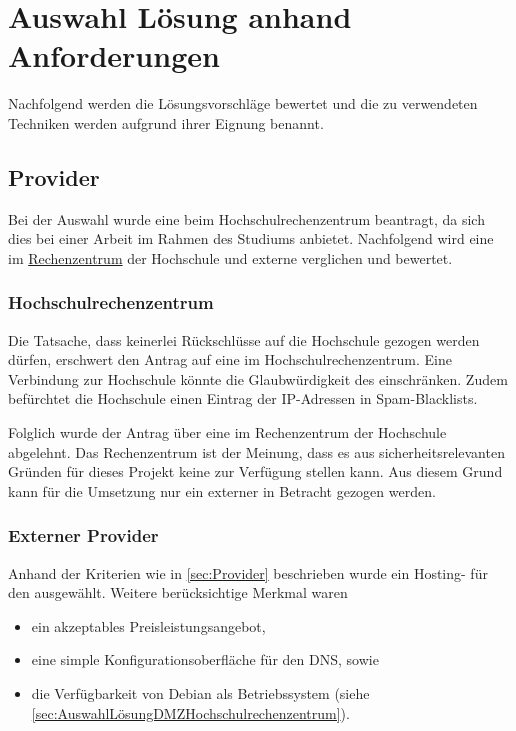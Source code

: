 \documentclass[a4paper,11pt,singlespacing]{article}
\begin{document}
\newpage


\section{Auswahl Lösung anhand Anforderungen}\label{sec:AuswahlLösungAnhandAnforderungen}
	Nachfolgend werden die Lösungsvorschläge bewertet und die zu verwendeten Techniken werden aufgrund ihrer Eignung benannt.

	\subsection{Provider}\label{sec:AuswahlLösungProvider}
		Bei der  Auswahl wurde eine  beim Hochschulrechenzentrum beantragt, da sich dies bei einer Arbeit im Rahmen des Studiums anbietet.
		Nachfolgend wird eine  im \href{https://www.hs-weingarten.de/web/rechenzentrum}{Rechenzentrum} der Hochschule und externe  verglichen und bewertet.
		
		\subsubsection{Hochschulrechenzentrum}\label{sec:AuswahlLösungDMZHochschulrechenzentrum}
			Die Tatsache, dass keinerlei Rückschlüsse auf die Hochschule gezogen werden dürfen, erschwert den Antrag auf eine  im Hochschulrechenzentrum.
			Eine Verbindung zur Hochschule könnte die Glaubwürdigkeit des  einschränken.
			Zudem befürchtet die Hochschule einen Eintrag der IP-Adressen in Spam-Blacklists.

			Folglich wurde der Antrag über eine  im Rechenzentrum der Hochschule abgelehnt.
			Das Rechenzentrum ist der Meinung, dass es aus sicherheitsrelevanten Gründen für dieses Projekt keine  zur Verfügung stellen kann.
			Aus diesem Grund kann für die Umsetzung nur ein externer  in Betracht gezogen werden.

		\subsubsection{Externer Provider}\label{sec:AuswahlLösungExterneProvider}
			Anhand der Kriterien wie in \autoref{sec:Provider} beschrieben wurde ein Hosting- für den  ausgewählt.
			Weitere berücksichtige Merkmal waren
			\begin{itemize}
				\item ein akzeptables Preisleistungsangebot,
				\item eine simple Konfigurationsoberfläche für den DNS, sowie
				\item die Verfügbarkeit von Debian als Betriebssystem (siehe \autoref{sec:AuswahlLösungDMZHochschulrechenzentrum}).
			\end{itemize}		
\end{document}
